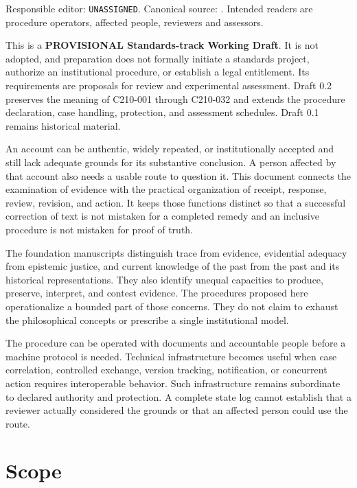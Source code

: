 \documentclass[11pt,a4paper]{article}
\begin{document}
\GSPfrontmatter
{}
Responsible editor: \texttt{UNASSIGNED}. Canonical source: . Intended readers are procedure operators, affected people, reviewers and assessors.

This is a \textbf{PROVISIONAL Standards-track Working Draft}. It is not adopted, and preparation does not formally initiate a standards project, authorize an institutional procedure, or establish a legal entitlement. Its requirements are proposals for review and experimental assessment. Draft 0.2 preserves the meaning of C210-001 through C210-032 and extends the procedure declaration, case handling, protection, and assessment schedules. Draft 0.1 remains historical material.

\tableofcontents\clearpage
{}
An account can be authentic, widely repeated, or institutionally accepted and still lack adequate grounds for its substantive conclusion. A person affected by that account also needs a usable route to question it. This document connects the examination of evidence with the practical organization of receipt, response, review, revision, and action. It keeps those functions distinct so that a successful correction of text is not mistaken for a completed remedy and an inclusive procedure is not mistaken for proof of truth.

The foundation manuscripts distinguish trace from evidence, evidential adequacy from epistemic justice, and current knowledge of the past from the past and its historical representations. They also identify unequal capacities to produce, preserve, interpret, and contest evidence. The procedures proposed here operationalize a bounded part of those concerns. They do not claim to exhaust the philosophical concepts or prescribe a single institutional model.

The procedure can be operated with documents and accountable people before a machine protocol is needed. Technical infrastructure becomes useful when case correlation, controlled exchange, version tracking, notification, or concurrent action requires interoperable behavior. Such infrastructure remains subordinate to declared authority and protection. A complete state log cannot establish that a reviewer actually considered the grounds or that an affected person could use the route.

\GSPmainmatter
\section{Scope}
\end{document}
